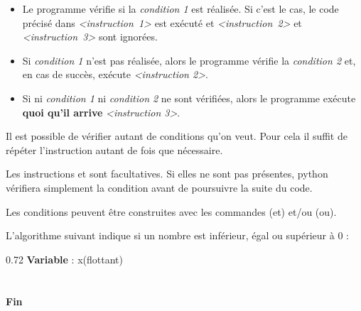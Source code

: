 \noindent\begin{itemize}[leftmargin=*]
\item Le programme vérifie si la \textit{condition 1} est réalisée. Si c'est le cas, le code précisé dans \textit{\mbox{<instruction 1>}} est exécuté et \textit{\mbox{<instruction 2>}} et \textit{\mbox{<instruction 3>}} sont ignorées.
\item Si \textit{condition 1} n'est pas réalisée, alors le programme vérifie la \textit{condition 2} et, en cas de succès, exécute \textit{<instruction 2>}.
\item Si ni \textit{condition 1} ni \textit{condition 2} ne sont vérifiées, alors le programme exécute \textbf{quoi qu'il arrive} \textit{<instruction 3>}.
\end{itemize}

\begin{remarques}
\item Il est possible de vérifier autant de conditions qu'on veut. Pour cela il suffit de répéter l'instruction  autant de fois que nécessaire.
\item Les instructions  et  sont facultatives. Si elles ne sont pas présentes, python vérifiera simplement la condition  avant de poursuivre la suite du code.
\item Les conditions peuvent être construites avec les commandes \textbf{} (et) et/ou \textbf{} (ou).
\end{remarques}


\begin{exemple}
L'algorithme suivant indique si un nombre est inférieur, égal ou supérieur à $0$ :

\begin{center}
\begin{affichagealgorithme}{0.72}
\textbf{Variable} : x(flottant)\\
\\
\\
\textbf{Fin}
\end{affichagealgorithme}
\end{center}
\end{exemple}




